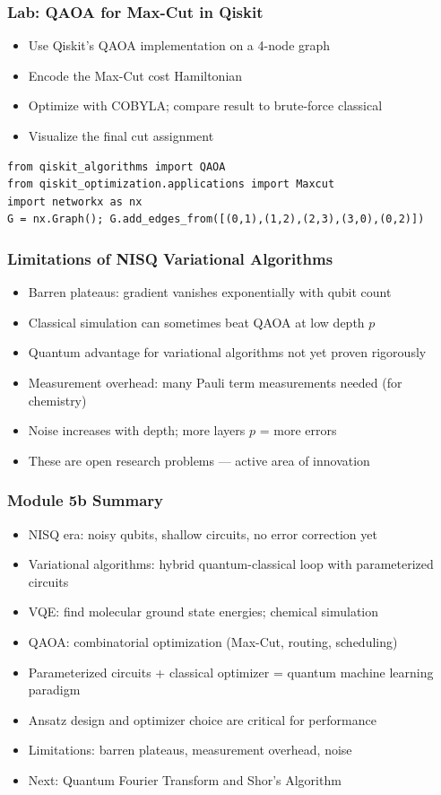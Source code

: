 \begin{frame}[fragile]\frametitle{Lab: QAOA for Max-Cut in Qiskit}
\begin{itemize}
\item Use Qiskit's QAOA implementation on a 4-node graph
\item Encode the Max-Cut cost Hamiltonian
\item Optimize with COBYLA; compare result to brute-force classical
\item Visualize the final cut assignment
\end{itemize}
\begin{verbatim}
from qiskit_algorithms import QAOA
from qiskit_optimization.applications import Maxcut
import networkx as nx
G = nx.Graph(); G.add_edges_from([(0,1),(1,2),(2,3),(3,0),(0,2)])
\end{verbatim}
\end{frame}

\begin{frame}[fragile]\frametitle{Limitations of NISQ Variational Algorithms}
\begin{itemize}
\item Barren plateaus: gradient vanishes exponentially with qubit count
\item Classical simulation can sometimes beat QAOA at low depth $p$
\item Quantum advantage for variational algorithms not yet proven rigorously
\item Measurement overhead: many Pauli term measurements needed (for chemistry)
\item Noise increases with depth; more layers $p$ = more errors
\item These are open research problems --- active area of innovation
\end{itemize}
\end{frame}

\begin{frame}[fragile]\frametitle{Module 5b Summary}
\begin{itemize}
\item NISQ era: noisy qubits, shallow circuits, no error correction yet
\item Variational algorithms: hybrid quantum-classical loop with parameterized circuits
\item VQE: find molecular ground state energies; chemical simulation
\item QAOA: combinatorial optimization (Max-Cut, routing, scheduling)
\item Parameterized circuits + classical optimizer = quantum machine learning paradigm
\item Ansatz design and optimizer choice are critical for performance
\item Limitations: barren plateaus, measurement overhead, noise
\item Next: Quantum Fourier Transform and Shor's Algorithm
\end{itemize}
\end{frame}
